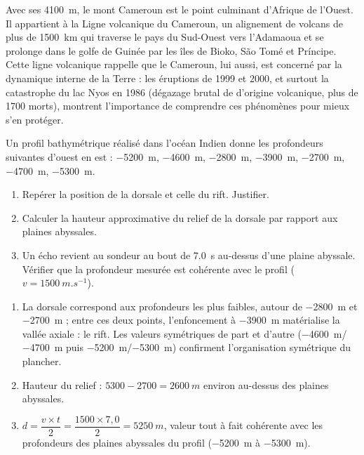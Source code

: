 \documentclass[11pt]{article}
\newcommand{\cle}[1]{{\popxbold\color{popdark}#1}}
\begin{document}
\begin{savaistu}
Avec ses \SI{4100}{m}, le mont Cameroun est le point culminant d'Afrique de l'Ouest. Il appartient à la \cle{Ligne volcanique du Cameroun}, un alignement de volcans de plus de \SI{1500}{km} qui traverse le pays du Sud-Ouest vers l'Adamaoua et se prolonge dans le golfe de Guinée par les îles de Bioko, São Tomé et Príncipe. Cette ligne volcanique rappelle que le Cameroun, lui aussi, est concerné par la dynamique interne de la Terre : les éruptions de 1999 et 2000, et surtout la catastrophe du lac Nyos en 1986 (dégazage brutal de  d'origine volcanique, plus de \num{1700} morts), montrent l'importance de comprendre ces phénomènes pour mieux s'en protéger.
\end{savaistu}

\begin{exercice}
Un profil bathymétrique réalisé dans l'océan Indien donne les profondeurs suivantes d'ouest en est : \SI{-5200}{m}, \SI{-4600}{m}, \SI{-2800}{m}, \SI{-3900}{m}, \SI{-2700}{m}, \SI{-4700}{m}, \SI{-5300}{m}.
\begin{enumerate}
\item Repérer la position de la dorsale et celle du rift. Justifier.
\item Calculer la hauteur approximative du relief de la dorsale par rapport aux plaines abyssales.
\item Un écho revient au sondeur au bout de \SI{7,0}{s} au-dessus d'une plaine abyssale. Vérifier que la profondeur mesurée est cohérente avec le profil ($v = \SI{1500}{m.s^{-1}}$).
\end{enumerate}
\end{exercice}

\begin{corrige}
\begin{enumerate}
\item La dorsale correspond aux profondeurs les plus faibles, autour de \SI{-2800}{m} et \SI{-2700}{m} ; entre ces deux points, l'enfoncement à \SI{-3900}{m} matérialise la vallée axiale : le \cle{rift}. Les valeurs symétriques de part et d'autre (\SI{-4600}{m}/\SI{-4700}{m} puis \SI{-5200}{m}/\SI{-5300}{m}) confirment l'organisation symétrique du plancher.
\item Hauteur du relief : $5300 - 2700 = \SI{2600}{m}$ environ au-dessus des plaines abyssales.
\item $d = \dfrac{v \times t}{2} = \dfrac{1500 \times 7{,}0}{2} = \SI{5250}{m}$, valeur tout à fait cohérente avec les profondeurs des plaines abyssales du profil (\SI{-5200}{m} à \SI{-5300}{m}).
\end{enumerate}
\end{corrige}
\end{document}
